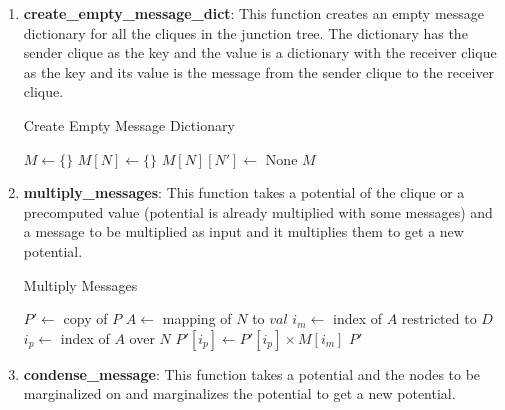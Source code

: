 \documentclass[12pt]{article}
\begin{document}
\begin{enumerate}
    \item \textbf{create\_empty\_message\_dict}: This function creates an empty message dictionary for all the cliques in the junction tree. The dictionary has the sender clique as the key and the value is a dictionary with the receiver clique as the key and its value is the message from the sender clique to the receiver clique.
    
    \begin{algorithm}
        \caption{Create Empty Message Dictionary}
        \begin{algorithmic}[1]
            \State $M \gets \{\}$
                \State $M[N] \gets \{\}$
                    \State $M[N][N'] \gets$ None
                \EndFor
            \EndFor
            \State \Return $M$
        \EndFunction
        \end{algorithmic}
    \end{algorithm}        
    
    \item \textbf{multiply\_messages}: This function takes a potential of the clique or a precomputed value (potential is already multiplied with some messages) and a message to be multiplied as input and it multiplies them to get a new potential.
    
    \begin{algorithm}
        \caption{Multiply Messages}
        \begin{algorithmic}[1]
            \State $P' \gets$ copy of $P$
                \State $A \gets$ mapping of $N$ to $val$
                \State $i_m \gets$ index of $A$ restricted to $D$
                \State $i_p \gets$ index of $A$ over $N$
                \State $P'[i_p] \gets P'[i_p] \times M[i_m]$
            \EndFor
            \State \Return $P'$
        \EndFunction
        \end{algorithmic}
    \end{algorithm}
        
    \item \textbf{condense\_message}: This function takes a potential and the nodes to be marginalized on and marginalizes the potential to get a new potential.
    

\end{enumerate}
\end{document}
